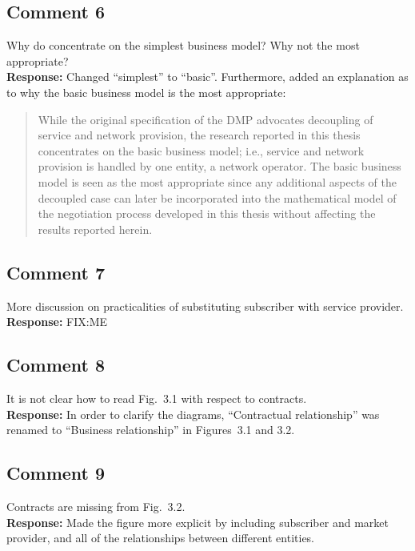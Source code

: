 \documentclass[10pt,a4paper,notitlepage]{article}
\numberwithin{equation}{section}
\begin{document}
\subsection{Comment 6}
Why do concentrate on the simplest business model? Why not the most appropriate?\\[-2ex]

\textbf{Response:}
Changed ``simplest'' to ``basic''. Furthermore, added an explanation as to why the basic business model is the most appropriate:
\begin{quote}
While the original specification of the DMP advocates decoupling of service and network provision, the research reported in this thesis concentrates on the basic business model; i.e., service and network provision is handled by one entity, a network operator. The basic business model is seen as the most appropriate since any additional aspects of the decoupled case can later be incorporated into the mathematical model of the negotiation process developed in this thesis without affecting the results reported herein.
\end{quote}

\subsection{Comment 7}
More discussion on practicalities of substituting subscriber with service provider.\\[-2ex]

\textbf{Response:}
FIX:ME

\subsection{Comment 8}
It is not clear how to read Fig.~3.1 with respect to contracts.\\[-2ex]

\textbf{Response:}
In order to clarify the diagrams, ``Contractual relationship'' was renamed to ``Business relationship'' in Figures~3.1 and 3.2.

\subsection{Comment 9}
Contracts are missing from Fig.~3.2.\\[-2ex]

\textbf{Response:}
Made the figure more explicit by including subscriber and market provider, and all of the relationships between different entities.
\end{document}
